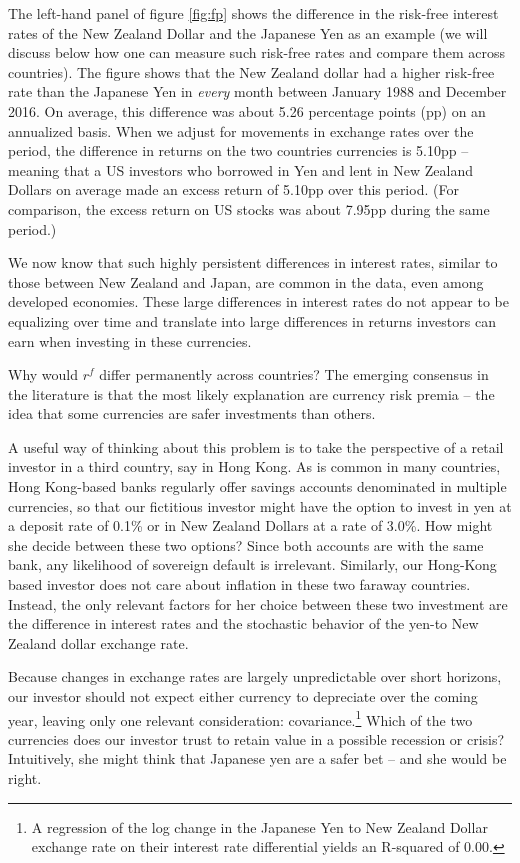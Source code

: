 \documentclass{ar-1col}
\begin{document}
The left-hand panel of figure \ref{fig:fp} shows the difference in the risk-free interest rates of the New Zealand Dollar and the Japanese Yen as an example (we will discuss below how one can measure such risk-free rates and compare them across countries). The figure shows that the New Zealand dollar had a higher risk-free rate than the Japanese Yen in \textit{every} month between January 1988 and December 2016. On average, this difference was about 5.26 percentage points (pp) on an annualized basis. When we adjust for movements in exchange rates over the period, the difference in returns on the two countries currencies is 5.10pp -- meaning that a US investors who borrowed in Yen and lent in New Zealand Dollars on average made an excess return of 5.10pp over this period. (For comparison, the excess return on US stocks was about 7.95pp during the same period.)

We now know that such highly persistent differences in interest rates, similar to those between New Zealand and Japan, are common in the data, even among developed economies. These large differences in interest rates do not appear to be equalizing over time and translate into large differences in returns investors can earn when investing in these currencies.

Why would $r^f$ differ permanently across countries? The emerging consensus in the literature is that the most likely explanation are currency risk premia -- the idea that some currencies are safer investments than others.

A useful way of thinking about this problem is to take the perspective of a retail investor in a third country, say in Hong Kong. As is common in many countries, Hong Kong-based banks regularly offer savings accounts denominated in multiple currencies, so that our fictitious investor might have the option to invest in yen at a deposit rate of 0.1\% or in New Zealand Dollars at a rate of 3.0\%. How might she decide between these two options? Since both accounts are with the same bank, any likelihood of sovereign default is irrelevant. Similarly, our Hong-Kong based investor does not care about inflation in these two faraway countries. Instead, the only relevant factors for her choice between these two investment are the difference in interest rates and the stochastic behavior of the yen-to New Zealand dollar exchange rate.

Because changes in exchange rates are largely unpredictable over short horizons, our investor should not expect either currency to depreciate over the coming year, leaving only one relevant consideration: covariance.\footnote{A regression of the log change in the Japanese Yen to New Zealand Dollar exchange rate on their interest rate differential yields an R-squared of 0.00.} Which of the two currencies does our investor trust to retain value in a possible recession or crisis? Intuitively, she might think that Japanese yen are a safer bet -- and she would be right.
\end{document}
